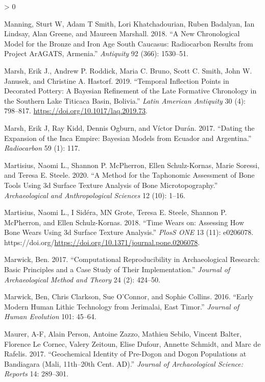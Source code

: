 \documentclass[
]{article}
\newlength{\cslhangindent}
\newenvironment{CSLReferences}[2] %
 {%
  \setlength{\parindent}{0pt}
  \ifodd #1 \everypar{\setlength{\hangindent}{\cslhangindent}}\ignorespaces\fi
  \ifnum #2 > 0
  \setlength{\parskip}{#2\baselineskip}
  \fi
 }%
 {}
\begin{document}
\begin{CSLReferences}{1}{0}
\leavevmode\hypertarget{ref-manning_new_2018}{}%
Manning, Sturt W, Adam T Smith, Lori Khatchadourian, Ruben Badalyan, Ian
Lindsay, Alan Greene, and Maureen Marshall. 2018. {``A New Chronological
Model for the {Bronze} and {Iron} {Age} {South} {Caucasus}: Radiocarbon
Results from {Project} {ArAGATS}, {Armenia}.''} \emph{Antiquity} 92
(366): 1530--51.

\leavevmode\hypertarget{ref-marsh_temporal_2019}{}%
Marsh, Erik J., Andrew P. Roddick, Maria C. Bruno, Scott C. Smith, John
W. Janusek, and Christine A. Hastorf. 2019. {``Temporal {Inflection}
{Points} in {Decorated} {Pottery}: {A} {Bayesian} {Refinement} of the
{Late} {Formative} {Chronology} in the {Southern} {Lake} {Titicaca}
{Basin}, {Bolivia}.''} \emph{Latin American Antiquity} 30 (4): 798--817.
\url{https://doi.org/10.1017/laq.2019.73}.

\leavevmode\hypertarget{ref-marsh_dating_2017}{}%
Marsh, Erik J, Ray Kidd, Dennis Ogburn, and Víctor Durán. 2017.
{``Dating the Expansion of the {Inca} Empire: {Bayesian} Models from
{Ecuador} and {Argentina}.''} \emph{Radiocarbon} 59 (1): 117.

\leavevmode\hypertarget{ref-martisius_method_2020}{}%
Martisius, Naomi L., Shannon P. McPherron, Ellen Schulz-Kornas, Marie
Soressi, and Teresa E. Steele. 2020. {``A Method for the Taphonomic
Assessment of Bone Tools Using {3d} Surface Texture Analysis of Bone
Microtopography.''} \emph{Archaeological and Anthropological Sciences}
12 (10): 1--16.

\leavevmode\hypertarget{ref-martisius_time_2018}{}%
Martisius, Naomi L., I Sidéra, MN Grote, Teresa E. Steele, Shannon P.
McPherron, and Ellen Schulz-Kornas. 2018. {``Time Wears on: {Assessing}
How Bone Wears Using {3d} Surface Texture Analysis.''} \emph{PlosS ONE}
13 (11): e0206078.
https://doi.org/\url{https://doi.org/10.1371/journal.pone.0206078}.

\leavevmode\hypertarget{ref-marwick_computational_2017}{}%
Marwick, Ben. 2017. {``Computational Reproducibility in Archaeological
Research: {Basic} Principles and a Case Study of Their
Implementation.''} \emph{Journal of Archaeological Method and Theory} 24
(2): 424--50.

\leavevmode\hypertarget{ref-marwick_early_2016}{}%
Marwick, Ben, Chris Clarkson, Sue O'Connor, and Sophie Collins. 2016.
{``Early Modern Human Lithic Technology from {Jerimalai}, {East}
{Timor}.''} \emph{Journal of Human Evolution} 101: 45--64.

\leavevmode\hypertarget{ref-maurer_geochemical_2017}{}%
Maurer, A-F, Alain Person, Antoine Zazzo, Mathieu Sebilo, Vincent
Balter, Florence Le Cornec, Valery Zeitoun, Elise Dufour, Annette
Schmidt, and Marc de Rafelis. 2017. {``Geochemical Identity of
Pre-{Dogon} and {Dogon} Populations at {Bandiagara} ({Mali}, 11th--20th
Cent. {AD}).''} \emph{Journal of Archaeological Science: Reports} 14:
289--301.


\end{CSLReferences}
\end{document}
